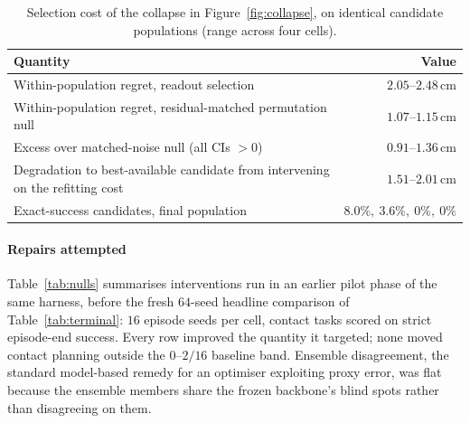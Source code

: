 \documentclass[11pt,letterpaper]{article}
\begin{document}
\begin{table}[t]
\centering\small
\caption{Selection cost of the collapse in Figure~\ref{fig:collapse}, on
identical candidate populations (range across four
cells).}\label{tab:mechanism}
\begin{tabular}{@{}L{9.5cm}r@{}}
\toprule
Quantity & Value \\
\midrule
Within-population regret, readout selection & $2.05$--$2.48$\,cm \\
Within-population regret, residual-matched permutation null & $1.07$--$1.15$\,cm \\
Excess over matched-noise null (all CIs $>0$) & $0.91$--$1.36$\,cm \\
Degradation to best-available candidate from intervening on the refitting cost & $1.51$--$2.01$\,cm \\
Exact-success candidates, final population & $8.0\%,\ 3.6\%,\ 0\%,\ 0\%$ \\
\bottomrule
\end{tabular}
\end{table}

\paragraph{Repairs attempted}
Table~\ref{tab:nulls} summarises interventions run in an earlier pilot phase
of the same harness, before the fresh $64$-seed headline comparison of
Table~\ref{tab:terminal}: $16$ episode seeds per cell, contact tasks scored on
strict episode-end success. Every row improved the quantity it targeted; none
moved contact planning outside the $0$--$2/16$ baseline band. Ensemble
disagreement, the standard model-based remedy for an optimiser exploiting
proxy error, was flat because the ensemble members share the frozen
backbone's blind spots rather than disagreeing on them.
\end{document}
